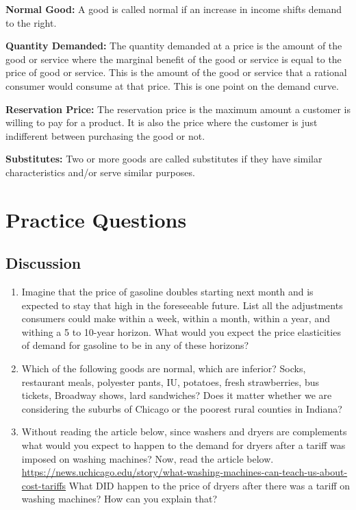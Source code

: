 \documentclass[
]{book}
\providecommand{\tightlist}{%
  \setlength{\itemsep}{0pt}\setlength{\parskip}{0pt}}
\begin{document}
\textbf{Normal Good:} A good is called normal if an increase in income shifts demand to the right.

\textbf{Quantity Demanded:} The quantity demanded at a price is the amount of the good or service where the marginal benefit of the good or service is equal to the price of good or service. This is the amount of the good or service that a rational consumer would consume at that price. This is one point on the demand curve.

\textbf{Reservation Price:} The reservation price is the maximum amount a customer is willing to pay for a product. It is also the price where the customer is just indifferent between purchasing the good or not.

\textbf{Substitutes:} Two or more goods are called substitutes if they have similar characteristics and/or serve similar purposes.

\hypertarget{practice-questions-3}{%
\section{Practice Questions}\label{practice-questions-3}}

\hypertarget{discussion-3}{%
\subsection{Discussion}\label{discussion-3}}

\begin{enumerate}
\def\labelenumi{\arabic{enumi}.}
\tightlist
\item
  Imagine that the price of gasoline doubles starting next month and is expected to stay that high in the foreseeable future. List all the adjustments consumers could make within a week, within a month, within a year, and withing a 5 to 10-year horizon. What would you expect the price elasticities of demand for gasoline to be in any of these horizons?\\
\item
  Which of the following goods are normal, which are inferior?
  Socks, restaurant meals, polyester pants, IU, potatoes, fresh strawberries, bus tickets, Broadway shows, lard sandwiches?
  Does it matter whether we are considering the suburbs of Chicago or the poorest rural counties in Indiana?
\item
  Without reading the article below, since washers and dryers are complements what would you expect to happen to the demand for dryers after a tariff was imposed on washing machines? Now, read the article below. \url{https://news.uchicago.edu/story/what-washing-machines-can-teach-us-about-cost-tariffs} What DID happen to the price of dryers after there was a tariff on washing machines? How can you explain that?
\end{enumerate}
\end{document}
